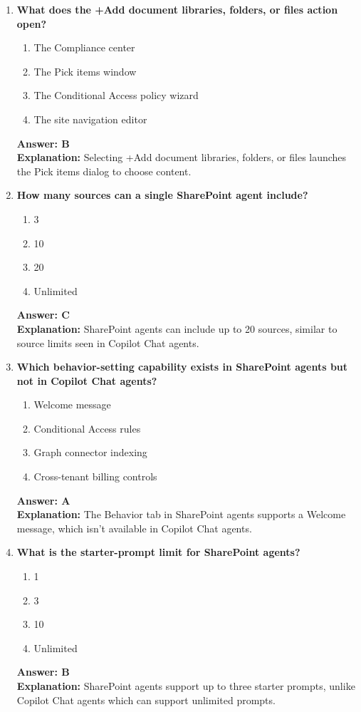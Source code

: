 \documentclass[10pt]{article}
\begin{document}
\begin{enumerate}[leftmargin=*]
\item \textbf{What does the +Add document libraries, folders, or files action open?}
\begin{enumerate}[label=\Alph*.]
  \item The Compliance center
  \item The Pick items window
  \item The Conditional Access policy wizard
  \item The site navigation editor
\end{enumerate}
\textbf{Answer: B}\\
\textbf{Explanation:} Selecting +Add document libraries, folders, or files launches the Pick items dialog to choose content.

\item \textbf{How many sources can a single SharePoint agent include?}
\begin{enumerate}[label=\Alph*.]
  \item 3
  \item 10
  \item 20
  \item Unlimited
\end{enumerate}
\textbf{Answer: C}\\
\textbf{Explanation:} SharePoint agents can include up to 20 sources, similar to source limits seen in Copilot Chat agents.

\item \textbf{Which behavior-setting capability exists in SharePoint agents but not in Copilot Chat agents?}
\begin{enumerate}[label=\Alph*.]
  \item Welcome message
  \item Conditional Access rules
  \item Graph connector indexing
  \item Cross-tenant billing controls
\end{enumerate}
\textbf{Answer: A}\\
\textbf{Explanation:} The Behavior tab in SharePoint agents supports a Welcome message, which isn't available in Copilot Chat agents.

\item \textbf{What is the starter-prompt limit for SharePoint agents?}
\begin{enumerate}[label=\Alph*.]
  \item 1
  \item 3
  \item 10
  \item Unlimited
\end{enumerate}
\textbf{Answer: B}\\
\textbf{Explanation:} SharePoint agents support up to three starter prompts, unlike Copilot Chat agents which can support unlimited prompts.


\end{enumerate}
\end{document}
